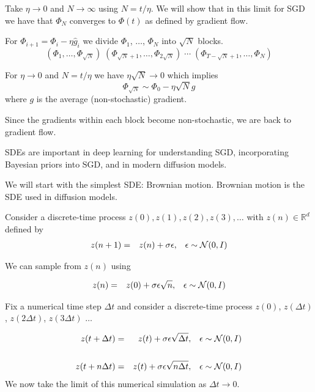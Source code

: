 {\vfill
Take $\eta \rightarrow 0$ and $N \rightarrow \infty$ using $N = t/\eta$.  We will show that in this limit for SGD we have that $\Phi_N$ converges to $\Phi(t)$
as defined by gradient flow.

For $\Phi_{i+1} = \Phi_i - \eta \hat{g}_i$ we divide $\Phi_1$, $\ldots$, $\Phi_N$ into $\sqrt{N}$ blocks.
$$(\Phi_1,\dots,\Phi_{\sqrt{N}})\;(\Phi_{\sqrt{N}+1},\ldots,\Phi_{2\sqrt{N}})\;\cdots\;(\Phi_{T-\sqrt{N}+1},\ldots,\Phi_N)$$

\vfill
For $\eta \rightarrow 0$ and $N = t/\eta$ we have $\eta\sqrt{N} \rightarrow 0$ which implies
$$\Phi_{\sqrt{N}} \sim \Phi_0 - \eta\sqrt{N} g$$
where $g$ is the average (non-stochastic)
gradient.

\vfill
Since the gradients within each block become non-stochastic, we are back to gradient flow.



SDEs are important in deep learning for understanding SGD, incorporating Bayesian priors into SGD,
and in modern diffusion models.

\vfill
We will start with the simplest SDE: Brownian motion.  Brownian motion is the SDE used in diffusion models.


Consider a discrete-time process $z(0),z(1),z(2),z(3),\ldots$ with $z(n)\in \mathbb{R}^d$ defined by
\begin{eqnarray*}
  z(n+1) & = & z(n) + \sigma\epsilon,\;\;\;\epsilon \sim {\cal N}(0,I)
\end{eqnarray*}

\vfill
We can sample from $z(n)$ using

\begin{eqnarray*}
  z(n) & = & z(0) + \sigma\epsilon\sqrt{n} ,\;\;\;\epsilon \sim {\cal N}(0,I)
\end{eqnarray*}

Fix a numerical time step $\Delta t$ and consider a discrete-time process $z(0)$, $z(\Delta t)$, $z(2\Delta t)$, $z(3\Delta t)$ $\ldots$

{\huge
\begin{eqnarray*}
  z(t+\Delta t) & = & z(t) + \sigma\epsilon\sqrt{\Delta t},\;\;\;\epsilon\sim {\cal N}(0,I) \\
  \\
  z(t+n\Delta t) & = & z(t) + \sigma\epsilon\sqrt{n\Delta t},\;\;\;\epsilon\sim {\cal N}(0,I) \\    
\end{eqnarray*}
}
We now take the limit of this numerical simulation as $\Delta t \rightarrow 0$.

}

